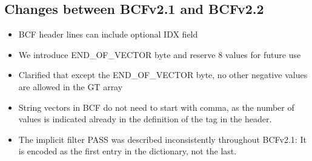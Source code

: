 \documentclass[8pt]{article}
\begin{document}
\subsection{Changes between BCFv2.1 and BCFv2.2}
\begin{itemize}
\item BCF header lines can include optional IDX field
\item We introduce END\_OF\_VECTOR byte and reserve 8 values for future use
\item Clarified that except the END\_OF\_VECTOR byte, no other negative values are allowed in the GT array 
\item String vectors in BCF do not need to start with comma, as the number of values is indicated already in the definition of the tag in the header.
\item The implicit filter PASS was described inconsistently throughout BCFv2.1: It is encoded as the first entry in the dictionary, not the last.
\end{itemize}
\end{document}
